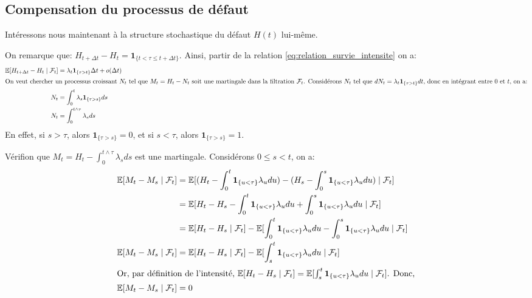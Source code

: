 \subsection{Compensation du processus de défaut}

Intéressons nous maintenant à la structure stochastique du défaut $H(t)$ lui-même. 

On remarque que: $H_{t + \Delta t} - H_t = \mathbf{1}_{\{t < \tau \le t + \Delta t\}}$. Ainsi,  partir de la relation \ref{eq:relation_survie_intensite}  on a:
\begin{align*}
\mathbb{E}[H_{t + \Delta t} - H_t \mid \mathcal{F}_t] &= \lambda_t \mathbf{1}_{\{\tau > t\}} \Delta t + o(\Delta t) \\
\intertext{On veut chercher un processus croissant $N_t$ tel que $M_t = H_t - N_t$ soit une martingale dans la filtration $\mathcal{F}_t$. Considérons $N_t$ tel que $dN_t = \lambda_t \mathbf{1}_{\{\tau > t\}} dt$, donc en intégrant entre $0$ et $t$, on a:}
N_t &= \int_0^t \lambda_s \mathbf{1}_{\{\tau > s\}}ds \\
N_t &= \int_0^{t \land \tau} \lambda_s ds
\end{align*}
En effet, si $s > \tau$, alors $\mathbf{1}_{\{\tau > s\}} = 0$, et si $s < \tau$, alors $\mathbf{1}_{\{\tau > s\}} = 1$.

Vérifion que $M_t = H_t - \int_0^{t \land \tau} \lambda_s ds$ est une martingale. Considérons $0 \le s < t$, on a:
\begin{align*}
    \mathbb{E}[M_t - M_s \mid \mathcal{F}_t] &= \mathbb{E}[(H_t - \int_0^t \mathbf{1}_{\{u < \tau\}}\lambda_u du) - (H_s - \int_0^s \mathbf{1}_{\{u < \tau\}} \lambda_udu) \mid \mathcal{F}_t] \\
    &= \mathbb{E}[H_t - H_s - \int_0^t \mathbf{1}_{\{u < \tau\}} \lambda_u du + \int_0^s \mathbf{1}_{\{u < \tau\}} \lambda_udu \mid \mathcal{F}_t] \\
    &= \mathbb{E}[H_t - H_s \mid \mathcal{F}_t] - \mathbb{E}[\int_0^t \mathbf{1}_{\{u < \tau\}} \lambda_u du - \int_0^s \mathbf{1}_{\{u < \tau\}} \lambda_udu \mid \mathcal{F}_t] \\
    \mathbb{E}[M_t - M_s \mid \mathcal{F}_t] &= \mathbb{E}[H_t - H_s \mid \mathcal{F}_t] - \mathbb{E}[\int_s^t \mathbf{1}_{\{u < \tau\}} \lambda_udu \mid \mathcal{F}_t] \\
    \intertext{Or, par définition de l'intensité, $\mathbb{E}[H_t - H_s \mid \mathcal{F}_t] = \mathbb{E}[\int_s^t \mathbf{1}_{\{u < \tau\}} \lambda_udu \mid \mathcal{F}_t]$. Donc,}
    \mathbb{E}[M_t - M_s \mid \mathcal{F}_t] &= 0
\end{align*}

